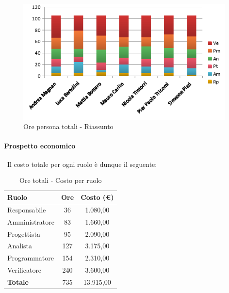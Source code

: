 \documentclass[./PianoDiProgetto.tex]{subfiles}
\begin{document}
	\begin{figure}[H]
		\centering
		\includegraphics[width=11cm, trim=1cm 0cm 1cm 0cm]{grafici/TOT-persona}
			\caption{Ore persona totali - Riassunto}
	\end{figure}

\newpage

	\paragraph{Prospetto economico}\
					Il costo totale per ogni ruolo è dunque il seguente:
	\begin{table}[H]
		\centering
		\begin{tabular}{l * {2}{c}}
			\toprule
			\textbf{Ruolo} & \textbf{Ore} & \textbf{Costo (\euro{})} \\
			\midrule
			Responsabile & 36    &  1.080,00 \\
			Amministratore  & 83   &  1.660,00 \\
			Progettista  & 95   &  2.090,00 \\
			Analista & 127   &  3.175,00 \\
			Programmatore  & 154   &  2.310,00 \\
			Verificatore  & 240   &  3.600,00 \\
			\midrule
			\textbf{Totale}  & 735  &  13.915,00 \\
			\bottomrule

		\end{tabular}
		\caption{Ore totali - Costo per ruolo}
	\end{table}

\vspace{35 mm}
\end{document}
